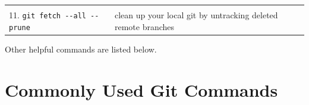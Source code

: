 \documentclass[]{book}
\begin{document}
\begin{longtable}[]{@{}ll@{}}
\begin{minipage}[t]{0.22\columnwidth}
\strut
\end{minipage}\tabularnewline
\begin{minipage}[t]{0.13\columnwidth}\raggedright\strut
11. \texttt{git\ fetch\ -\/-all\ -\/-prune}\strut
\end{minipage} & \begin{minipage}[t]{0.22\columnwidth}\raggedright\strut
clean up your local git by untracking deleted remote branches\strut
\end{minipage}\tabularnewline
\bottomrule
\end{longtable}

Other helpful commands are listed below.

\section{Commonly Used Git Commands}\label{commonly-used-git-commands}
\end{document}

